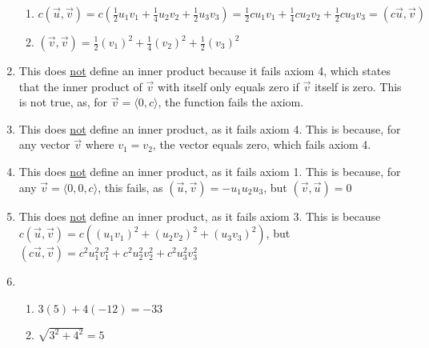 \documentclass[12pt]{article}
\begin{document}
\begin{enumerate}
\begin{enumerate}
      \item $c(\overrightarrow{u},\overrightarrow{v})=c(\frac{1}{2}u_1v_1+\frac{1}{4}u_2v_2+\frac{1}{2}u_3v_3)=\frac{1}{2}cu_1v_1+\frac{1}{4}cu_2v_2+\frac{1}{2}cu_3v_3=(c\overrightarrow{u},\overrightarrow{v})$ \textcolor{green}{\checkmark}

      \item $(\overrightarrow{v},\overrightarrow{v})=\frac{1}{2}(v_1)^2+\frac{1}{4}(v_2)^2+\frac{1}{2}(v_3)^2$ \textcolor{green}{\checkmark}

    \end{enumerate}

  \item This does \underline{not} define an inner product because it fails axiom 4, which states that the inner product of $\overrightarrow{v}$ with itself only equals zero if $\overrightarrow{v}$ itself is zero. This is not true, as, for $\overrightarrow{v}=\langle0, c\rangle$, the function fails the axiom.

    \setcounter{enumi}{10}

  \item This does \underline{not} define an inner product, as it fails axiom 4. This is because, for any vector $\overrightarrow{v}$ where $v_1=v_2$, the vector equals zero, which fails axiom 4.

    \setcounter{enumi}{12}

  \item This does \underline{not} define an inner product, as it fails axiom 1. This is because, for any $\overrightarrow{v}=\langle 0,0,c\rangle$, this fails, as $(\overrightarrow{u},\overrightarrow{v})=-u_1u_2u_3$, but $(\overrightarrow{v},\overrightarrow{u})=0$

    \setcounter{enumi}{14}

  \item This does \underline{not} define an inner product, as it fails axiom 3. This is because $c(\overrightarrow{u},\overrightarrow{v})=c( (u_1v_1)^2+(u_2v_2)^2+(u_3v_3)^2)$, but $(c\overrightarrow{u},\overrightarrow{v})=c^2u_1^2v_1^2+c^2u_2^2v_2^2+c^2u_3^2v_3^2$

    \setcounter{enumi}{16}

  \item

    \begin{enumerate}

      \item $3(5)+4(-12)=-33$

      \item $\sqrt{3^2+4^2}=5$


\end{enumerate}
\end{enumerate}
\end{document}
